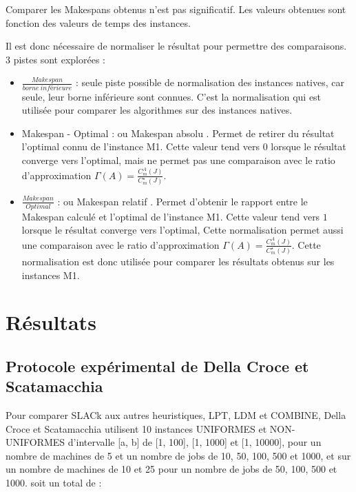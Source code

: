 \documentclass[a4paper,12pt]{report}
\theoremstyle{plain}				%
\theoremstyle{definition}				%
\begin{document}
Comparer les Makespans obtenus n'est pas significatif. Les valeurs obtenues sont fonction des valeurs de temps des instances.

Il est donc nécessaire de normaliser le résultat pour permettre des comparaisons. 3 pistes sont explorées :
\begin{itemize}

  \item $\frac{Makespan}{borne~inférieure}$ : seule piste possible de normalisation 
  des instances natives, car seule, leur borne inférieure sont connues. 
  C'est la normalisation qui est utilisée pour comparer les algorithmes sur 
  des instances natives.
  
  \item Makespan - Optimal : ou Makespan absolu \cite{benoit2021update}. 
  Permet de retirer du résultat l'optimal connu de l'instance M1.
  Cette valeur tend vers $0$ lorsque le résultat converge vers l'optimal, 
  mais ne permet pas une comparaison avec 
  le ratio d'approximation $\Gamma(A)=\frac{C_m^A(J)}{C_m^\star(J)}$.

  \item $\frac{Makespan}{Optimal}$ : ou Makespan relatif \cite{benoit2021update}.
  Permet d'obtenir le rapport entre le Makespan calculé et l'optimal de l'instance M1.
  Cette valeur tend vers $1$ lorsque le résultat converge vers l'optimal, 
  Cette normalisation permet aussi une comparaison avec  
  le ratio d'approximation $\Gamma(A)=\frac{C_m^A(J)}{C_m^\star(J)}$. 
  Cette normalisation est donc utilisée pour comparer les résultats obtenus sur les instances 
  M1.
\end{itemize}


\section{Résultats} \label{sec:resultats}

\subsection{Protocole expérimental de Della Croce et Scatamacchia}
\label{ssec:resultatsPrtocoleExperimentalDellaCroceScatamacchia}
 
Pour comparer SLACk aux autres heuristiques, LPT, LDM et COMBINE, Della Croce et Scatamacchia 
 utilisent 10 instances UNIFORMES et NON-UNIFORMES d'intervalle [a, b] de [1, 100], [1, 1000] et [1, 10000], pour un nombre de machines de 5 et un nombre de jobs de 10, 50, 100, 500 et 1000, et sur un nombre de machines de 10 et 25 pour un nombre de jobs de 50, 100, 500 et 1000.
soit un total de : 
\end{document}
